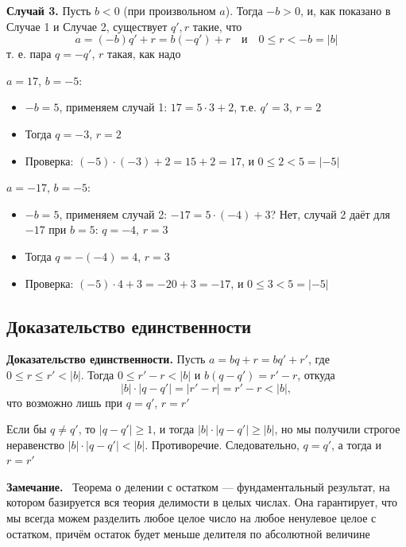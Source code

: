 \documentclass[a4paper,12pt]{article}
\newcommand{\myremark}{\textbf{Замечание.}\ }
\theoremstyle{definition}
\theoremstyle{plain}
\theoremstyle{remark}
\begin{document}
	\textbf{Случай 3.} Пусть $b < 0$ (при произвольном $a$). Тогда $-b > 0$, и, как показано в Случае 1 и Случае 2, существует $q', r$ такие, что
	\[
	a = (-b)q' + r = b(-q') + r \quad \text{и} \quad 0 \leq r < -b = |b|
	\]
	т. е. пара $q = -q'$, $r$ такая, как надо
	
	\begin{tcolorbox}[colback=blue!5, colframe=blue!40!black, title=Пример случая 3]
		$a = 17$, $b = -5$:
		\begin{itemize}
			\item $-b = 5$, применяем случай 1: $17 = 5 \cdot 3 + 2$, т.е. $q' = 3$, $r = 2$
			\item Тогда $q = -3$, $r = 2$
			\item Проверка: $(-5) \cdot (-3) + 2 = 15 + 2 = 17$, и $0 \leq 2 < 5 = |-5|$
		\end{itemize}
		
		$a = -17$, $b = -5$:
		\begin{itemize}
			\item $-b = 5$, применяем случай 2: $-17 = 5 \cdot (-4) + 3$? Нет, случай 2 даёт для $-17$ при $b=5$: $q = -4$, $r = 3$
			\item Тогда $q = -(-4) = 4$, $r = 3$
			\item Проверка: $(-5) \cdot 4 + 3 = -20 + 3 = -17$, и $0 \leq 3 < 5 = |-5|$
		\end{itemize}
	\end{tcolorbox}
	
	\subsection{Доказательство единственности}
	
	\noindent \textbf{Доказательство единственности.}
	Пусть $a = bq + r = bq' + r'$, где $0 \leq r \leq r' < |b|$. Тогда $0 \leq r' - r < |b|$ и $b(q - q') = r' - r$, откуда
	\[
	|b| \cdot |q - q'| = |r' - r| = r' - r < |b|,
	\]
	что возможно лишь при $q = q'$, $r = r'$
	
	\begin{tcolorbox}[colback=green!5, colframe=green!50!black, title=Пояснение единственности]
		Если бы $q \neq q'$, то $|q - q'| \geq 1$, и тогда $|b| \cdot |q - q'| \geq |b|$, но мы получили строгое неравенство $|b| \cdot |q - q'| < |b|$. Противоречие. Следовательно, $q = q'$, а тогда и $r = r'$
	\end{tcolorbox}
	
	\myremark
	Теорема о делении с остатком — фундаментальный результат, на котором базируется вся теория делимости в целых числах. Она гарантирует, что мы всегда можем разделить любое целое число на любое ненулевое целое с остатком, причём остаток будет меньше делителя по абсолютной величине
	
\end{document}
